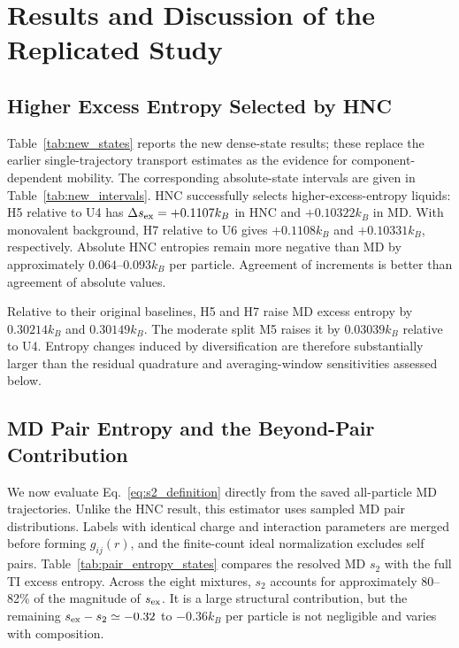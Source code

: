 \section{Results and Discussion of the Replicated Study}
\label{sec:results}

\subsection{Higher Excess Entropy Selected by HNC}

Table~\ref{tab:new_states} reports the new dense-state results; these replace the earlier single-trajectory transport estimates as the evidence for component-dependent mobility. The corresponding absolute-state intervals are given in Table~\ref{tab:new_intervals}. HNC successfully selects higher-excess-entropy liquids: H5 relative to U4 has $\Delta s_{\rm ex}=+0.1107k_B$ in HNC and $+0.10322k_B$ in MD. With monovalent background, H7 relative to U6 gives $+0.1108k_B$ and $+0.10331k_B$, respectively. Absolute HNC entropies remain more negative than MD by approximately $0.064$--$0.093k_B$ per particle. Agreement of increments is better than agreement of absolute values.





Relative to their original baselines, H5 and H7 raise MD excess entropy by $0.30214k_B$ and $0.30149k_B$. The moderate split M5 raises it by $0.03039k_B$ relative to U4. Entropy changes induced by diversification are therefore substantially larger than the residual quadrature and averaging-window sensitivities assessed below.

\subsection{MD Pair Entropy and the Beyond-Pair Contribution}

We now evaluate Eq.~\eqref{eq:s2_definition} directly from the saved all-particle MD trajectories. Unlike the HNC result, this estimator uses sampled MD pair distributions. Labels with identical charge and interaction parameters are merged before forming $g_{ij}(r)$, and the finite-count ideal normalization excludes self pairs. Table~\ref{tab:pair_entropy_states} compares the resolved MD $s_2$ with the full TI excess entropy. Across the eight mixtures, $s_2$ accounts for approximately 80--82\% of the magnitude of $s_{\rm ex}$. It is a large structural contribution, but the remaining $s_{\rm ex}-s_2\simeq-0.32$ to $-0.36k_B$ per particle is not negligible and varies with composition.

